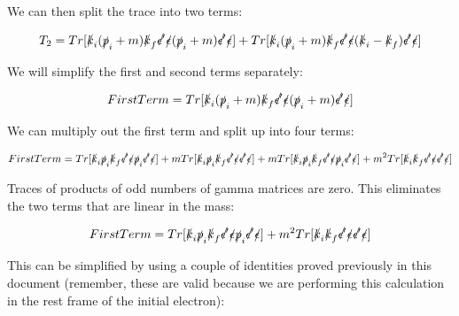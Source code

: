 \documentclass[a4]{article}
\begin{document}
    We can then split the trace into two terms:

    \begin{equation}
        T_2 = Tr [ \slashed{k}_i (\slashed{p}_i + m) \slashed{k}_f \slashed{\epsilon'} \slashed{\epsilon} (\slashed{p}_i + m ) \slashed{\epsilon'} \slashed{\epsilon} ] + Tr [ \slashed{k}_i (\slashed{p}_i + m) \slashed{k}_f \slashed{\epsilon'} \slashed{\epsilon} (\slashed{k}_i - \slashed{k}_f) \slashed{\epsilon'} \slashed{\epsilon} ]
    \end{equation}

    We will simplify the first and second terms separately:

    \begin{equation}
        First Term = Tr [ \slashed{k}_i (\slashed{p}_i + m) \slashed{k}_f \slashed{\epsilon'} \slashed{\epsilon} (\slashed{p}_i + m ) \slashed{\epsilon'} \slashed{\epsilon} ]
    \end{equation}

    We can multiply out the first term and split up into four terms:

    \begin{equation}
        First Term = Tr [\slashed{k}_i \slashed{p}_i \slashed{k}_f \slashed{\epsilon'} \slashed{\epsilon} \slashed{p}_i \slashed{\epsilon'} \slashed{\epsilon}] + m Tr[\slashed{k}_i \slashed{p}_i \slashed{k}_f \slashed{\epsilon'} \slashed{\epsilon} \slashed{\epsilon'} \slashed{\epsilon}] + m Tr[\slashed{k}_i \slashed{p}_i \slashed{k}_f \slashed{\epsilon'} \slashed{\epsilon} \slashed{p}_i \slashed{\epsilon'} \slashed{\epsilon}] + m^2 Tr[\slashed{k}_i \slashed{k}_f \slashed{\epsilon'} \slashed{\epsilon} \slashed{\epsilon'} \slashed{\epsilon}]
    \end{equation}

    Traces of products of odd numbers of gamma matrices are zero. This eliminates the two terms that are linear in the mass:

    \begin{equation}
        First Term = Tr [\slashed{k}_i \slashed{p}_i \slashed{k}_f \slashed{\epsilon'} \slashed{\epsilon} \slashed{p}_i \slashed{\epsilon'} \slashed{\epsilon}] + m^2 Tr[\slashed{k}_i \slashed{k}_f \slashed{\epsilon'} \slashed{\epsilon} \slashed{\epsilon'} \slashed{\epsilon}]
    \end{equation}

    This can be simplified by using a couple of identities proved previously in this document (remember, these are valid 
    because we are performing this calculation in the rest frame of the initial electron):
\end{document}
